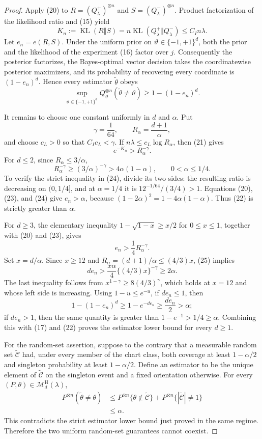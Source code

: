 \documentclass{article}
\begin{document}
\begin{proof}
Apply (20) to
\(R=(Q_\lambda^+)^{\otimes n}\) and
\(S=(Q_\lambda^-)^{\otimes n}\).  Product factorization of the likelihood ratio and (15) yield
\[
K_n:=\operatorname{KL}(R\Vert S)
=n\operatorname{KL}(Q_\lambda^+\Vert Q_\lambda^-)
\le C_In\lambda.
\tag{21}
\]
Let \(e_n=e(R,S)\).  Under the uniform prior on
\(\vartheta\in\{-1,+1\}^d\), both the prior and the likelihood of the experiment (16) factor over \(j\).  Consequently the posterior factorizes, the Bayes-optimal vector decision takes the coordinatewise posterior maximizers, and its probability of recovering every coordinate is \((1-e_n)^d\).  Hence every estimator \(\widetilde\theta\) obeys
\[
\sup_{\vartheta\in\{-1,+1\}^d}
Q_\vartheta^{\otimes n}(\widetilde\theta\ne\vartheta)
\ge 1-(1-e_n)^d.
\tag{22}
\]

It remains to choose one constant uniformly in \(d\) and \(\alpha\).  Put
\[
\gamma=\frac1{64},
\qquad
R_\alpha=\frac{d+1}{\alpha},
\]
and choose \(c_L>0\) so that \(C_Ic_L<\gamma\).  If
\(n\lambda\le c_L\log R_\alpha\), then (21) gives
\[
e^{-K_n}>R_\alpha^{-\gamma}.
\tag{23}
\]
For \(d\le2\), since \(R_\alpha\le3/\alpha\),
\[
R_\alpha^{-\gamma}
\ge(3/\alpha)^{-\gamma}>4\alpha(1-\alpha),
\qquad 0<\alpha\le1/4.
\tag{24}
\]
To verify the strict inequality in (24), divide its two sides: the resulting ratio is decreasing on \((0,1/4]\), and at \(\alpha=1/4\) it is
\(12^{-1/64}/(3/4)>1\).  Equations (20), (23), and (24) give \(e_n>\alpha\), because
\((1-2\alpha)^2=1-4\alpha(1-\alpha)\).  Thus (22) is strictly greater than \(\alpha\).

For \(d\ge3\), the elementary inequality
\(1-\sqrt{1-x}\ge x/2\) for \(0\le x\le1\), together with (20) and (23), gives
\[
e_n>\frac14R_\alpha^{-\gamma}.
\tag{25}
\]
Set \(x=d/\alpha\).  Since \(x\ge12\) and
\(R_\alpha=(d+1)/\alpha\le(4/3)x\), (25) implies
\[
de_n>
\frac{x\alpha}{4}\{(4/3)x\}^{-\gamma}
\ge2\alpha.
\tag{26}
\]
The last inequality follows from
\(x^{1-\gamma}\ge8(4/3)^\gamma\), which holds at \(x=12\) and whose left side is increasing.  Using \(1-u\le e^{-u}\), if \(de_n\le1\), then
\[
1-(1-e_n)^d\ge1-e^{-de_n}\ge\frac{de_n}{2}>\alpha;
\]
if \(de_n>1\), then the same quantity is greater than
\(1-e^{-1}>1/4\ge\alpha\).  Combining this with (17) and (22) proves the estimator lower bound for every \(d\ge1\).

For the random-set assertion, suppose to the contrary that a measurable random set \(\widetilde{\mathcal C}\) had, under every member of the chart class, both coverage at least \(1-\alpha/2\) and singleton probability at least \(1-\alpha/2\).  Define an estimator to be the unique element of \(\widetilde{\mathcal C}\) on the singleton event and a fixed orientation otherwise.  For every \((P,\theta)\in\mathcal M_d^{\mathrm H}(\lambda)\),
\[
\begin{aligned}
P^{\otimes n}(\widetilde\theta\ne\theta)
&\le P^{\otimes n}\{\theta\notin\widetilde{\mathcal C}\}
+P^{\otimes n}\{|\widetilde{\mathcal C}|\ne1\}\\
&\le\alpha.
\end{aligned}
\]
This contradicts the strict estimator lower bound just proved in the same regime.  Therefore the two uniform random-set guarantees cannot coexist.
\end{proof}
\end{document}
